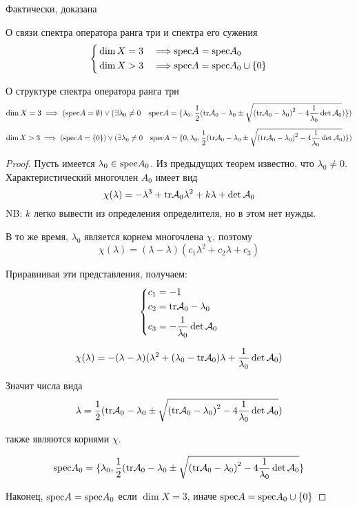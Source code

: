 Фактически, доказана
\begin{thm}{О связи спектра оператора ранга три и спектра его сужения}
  \begin{equation*}
    \left\{\begin{aligned}
      & \dim X = 3 & \implies & \mathrm{spec} A = \mathrm{spec} A_0 \\
      & \dim X > 3 & \implies & \mathrm{spec} A = \mathrm{spec} A_0 \cup \{0\}
    \end{aligned}\right.\end{equation*}
\end{thm}

\begin{thm}{О структуре спектра оператора ранга три}\*
  $$
  \dim X = 3 \implies
  (\mathrm{spec} A = \emptyset)
  \lor (\exists \lambda_0 \neq 0 \quad
  \mathrm{spec} A = \{\lambda_0,
    \frac{1}{2} (\mathrm{tr}\mathcal A_0 - \lambda_0
    \pm\sqrt{ {(\mathrm{tr}\mathcal A_0 - \lambda_0)}^2 - 4\frac{1}{\lambda_0} \det\mathcal A_0 })
  \})$$
  $$
  \dim X > 3 \implies
  (\mathrm{spec} A = \{0\})
  \lor (\exists \lambda_0 \neq 0 \quad
  \mathrm{spec} A = \{0, \lambda_0,
    \frac{1}{2} (\mathrm{tr}\mathcal A_0 - \lambda_0
    \pm\sqrt{ {(\mathrm{tr}\mathcal A_0 - \lambda_0)}^2 - 4\frac{1}{\lambda_0} \det\mathcal A_0 })
  \})$$
\end{thm}
\begin{proof}
  Пусть имеется $\lambda_0\in\mathrm{spec} A_0$.
  Из предыдущих теорем известно, что $\lambda_0\neq 0$.
  Характеристический многочлен $A_0$ имеет вид
  $$\chi(\lambda) = -\lambda^3 + \mathrm{tr}\mathcal A_0 \lambda^2 + k\lambda + \det\mathcal A_0$$
  NB: $k$ легко вывести из определения определителя, но в этом нет нужды.

  В то же время, $\lambda_0$ является корнем многочлена $\chi$, поэтому
  $$\chi(\lambda) = (\lambda - \lambda)(c_1 \lambda^2 + c_2 \lambda + c_3)$$

  Приравнивая эти представления, получаем:
  $$\left\{\begin{aligned}
    & c_1 = -1 \\
    & c_2 = \mathrm{tr}\mathcal A_0 - \lambda_0 \\
    & c_3 = - \frac{1}{\lambda_0} \det\mathcal A_0
  \end{aligned}\right.$$

  $$\chi(\lambda) = -(\lambda - \lambda)(\lambda^2 + (\lambda_0 - \mathrm{tr}\mathcal A_0) \lambda + \frac{1}{\lambda_0}\det\mathcal A_0)$$

  Значит числа вида
  $$\lambda =
  \frac{1}{2} (\mathrm{tr}\mathcal A_0 - \lambda_0
  \pm\sqrt{ {(\mathrm{tr}\mathcal A_0 - \lambda_0)}^2 - 4\frac{1}{\lambda_0} \det\mathcal A_0 }) $$

  также являются корнями $\chi$.

  $$\mathrm{spec} A_0 = \{\lambda_0,
    \frac{1}{2} (\mathrm{tr}\mathcal A_0 - \lambda_0
    \pm\sqrt{ {(\mathrm{tr}\mathcal A_0 - \lambda_0)}^2 - 4\frac{1}{\lambda_0} \det\mathcal A_0 }
  \}$$

  Наконец, $\mathrm{spec} A = \mathrm{spec} A_0$ если $\dim X = 3$, иначе $\mathrm{spec} A = \mathrm{spec} A_0 \cup \{ 0 \}$
\end{proof}
